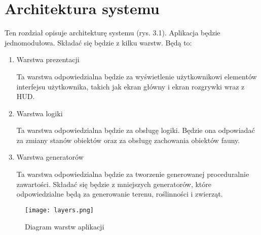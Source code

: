 \chapter{Architektura systemu}

Ten rozdział opisuje architekturę systemu (rys. 3.1). Aplikacja będzie jednomodułowa. Składać się będzie z kilku warstw. Będą to:


\begin{enumerate}
    \item Warstwa prezentacji
    
    Ta warstwa odpowiedzialna będzie za wyświetlenie użytkownikowi elementów interfejsu użytkownika, takich jak ekran główny i ekran rozgrywki wraz z HUD.
    
    \item Warstwa logiki
    
    Ta warstwa odpowiedzialna będzie za obsługę logiki. Będzie ona odpowiadać za zmiany stanów obiektów oraz za obsługę zachowania obiektów fauny.
    
    \item Warstwa generatorów
    
    Ta warstwa odpowiedzialna będzie za tworzenie generowanej proceduralnie zawartości. Składać się będzie z mniejszych generatorów, które odpowiedzialne będą za generowanie terenu, roślinności i zwierząt.
\end{enumerate}

\begin{figure}[H]
    \centering
        \texttt{[image: layers.png]}
        \caption{Diagram warstw aplikacji}
\end{figure}